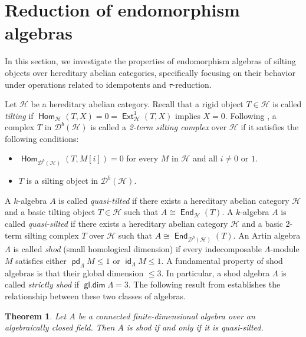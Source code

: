 \documentclass[12pt,a4paper,reqno]{amsart}
\newtheorem{theorem}{Theorem}[section]
\theoremstyle{definition}
\newcommand{\opname}[1]{\operatorname{\mathsf{#1}}}
\newcommand{\der}{\cd}
\newcommand{\pd}{\opname{pd}}
\newcommand{\id}{\opname{id}}
\newcommand{\gld}{\opname{gl.dim}}
\newcommand{\Hom}{\opname{Hom}}
\newcommand{\Ext}{\opname{Ext}}
\newcommand{\End}{\opname{End}}
\newcommand{\cd}{{\mathcal D}}
\begin{document}
\section{Reduction of endomorphism algebras}  \label{s:closure properties}
In this section, we investigate the properties of endomorphism algebras of silting objects over hereditary abelian categories, specifically focusing on their behavior under operations related to idempotents and $\tau$-reduction.

Let $\mathcal{H}$ be a hereditary abelian category. Recall that a rigid object $T\in \mathcal{H}$ is called {\em tilting} if $\Hom_{\mathcal{H}}(T, X) = 0 = \Ext_{\mathcal{H}}^1 (T, X)$ implies $X = 0$.
Following \cite[Definition 4.1 and Corollary 4.12]{BZ16b}, a complex $T$ in $\der^b(\mathcal{H})$ is called a \emph{2-term silting complex} over $\mathcal{H}$ if it satisfies the following conditions:
\begin{itemize}
    \item[(S1)] $\Hom_{\der^b(\mathcal{H})}(T, M[i]) = 0$ for every $M$ in $\mathcal{H}$ and all $i \neq 0$ or $1$.
    \item[(S2)] $T$ is a silting object in $\der^b(\mathcal{H})$.
\end{itemize}
A $k$-algebra $A$ is called {\em quasi-tilted} if there exists a hereditary abelian category $\mathcal{H}$ and a basic tilting object $T\in \mathcal{H}$ such that $A \cong\End_{\mathcal{H}}(T)$.
A $k$-algebra $A$ is called {\em quasi-silted} if there exists a hereditary abelian category $\mathcal{H}$ and a basic 2-term silting complex $T$ over $\mathcal{H}$ such that $A \cong \End_{\der^b(\mathcal{H})}(T)$. An Artin algebra $\Lambda$ is called {\em shod} (small homological dimension) if every indecomposable $\Lambda$-module $M$ satisfies either $\pd_\Lambda M \leq 1$ or $\id_\Lambda M \leq 1$. A fundamental property of shod algebras is that their global dimension $ \leq 3$. In particular, a shod algebra $\Lambda$ is called {\em strictly shod} if $\gld \Lambda = 3$. The following result from \cite{BZ16b} establishes the relationship between these two classes of algebras.
\begin{theorem}\label{t: shod and quasisilted}
Let $A$ be a connected finite-dimensional algebra over an algebraically closed field. Then $A$ is shod if and only if it is  quasi-silted.
\end{theorem}
\end{document}
